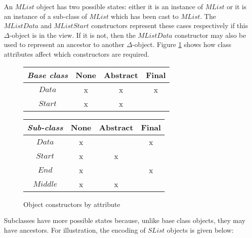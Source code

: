 \documentclass[runningheads,a4paper]{llncs}
\begin{document}
An $\mathit{MList}$ object has two possible states: either it is an instance of $\mathit{MList}$ or it is an instance of a sub-class of $\mathit{MList}$ which has been cast to $\mathit{MList}$. The $\mathit{MListData}$ and $\mathit{MListStart}$ constructors represent these cases respectively if this $\Delta$-object is in the view. If it is not, then the $\mathit{MListData}$ constructor may also be used to represent an ancestor to another $\Delta$-object. Figure \ref{tab:baseconstructors} shows how class attributes affect which constructors are required.

\begin{figure}
\begin{center}
\begin{tabular}{|c|c|c|c|}
\hline \emph{Base class} & None & Abstract & Final \\ 
\hline $\mathit{Data}$         & x & x & x \\ 
\hline $\mathit{Start}$     & x & x & \\
\hline
\end{tabular} 
\begin{tabular}{|c|c|c|c|}
\hline \emph{Sub-class} & None & Abstract & Final \\ 
\hline $\mathit{Data}$         & x &   & x \\ 
\hline $\mathit{Start}$     & x & x &   \\ 
\hline $\mathit{End}$     & x &   & x \\ 
\hline $\mathit{Middle}$ & x & x &   \\ 
\hline 
\end{tabular} 
\end{center}
\caption{Object constructors by attribute}
\label{tab:baseconstructors}
\end{figure}

Subclasses have more possible states because, unlike base class objects, they may have ancestors. For illustration, the encoding of $\mathit{SList}$ objects is given below:
\end{document}
